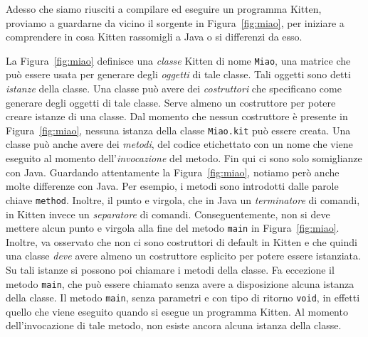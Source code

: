 Adesso che siamo riusciti a compilare ed eseguire un programma Kitten,
proviamo a guardarne \piu da vicino il sorgente in Figura~\ref{fig:miao}, per
iniziare a comprendere in cosa Kitten rassomigli a Java o si differenzi da esso.

La Figura~\ref{fig:miao} definisce una \emph{classe} Kitten di nome
\texttt{Miao}, \cioe una
matrice che pu\`o essere usata per generare degli \emph{oggetti} di tale
classe. Tali oggetti sono detti \emph{istanze} della classe.
Una classe pu\`o avere dei \emph{costruttori} che specificano come
generare degli oggetti di tale classe. Serve almeno un costruttore
per potere creare istanze di una classe. Dal momento che nessun costruttore
\`e presente in Figura~\ref{fig:miao}, nessuna istanza della classe
\texttt{Miao.kit} pu\`o essere creata.
Una classe pu\`o anche avere
dei \emph{metodi}, \cioe del codice etichettato con un nome che viene
eseguito al momento dell'\emph{invocazione} del metodo.
Fin qui ci sono solo somiglianze con Java.
Guardando attentamente la Figura~\ref{fig:miao},
notiamo per\`o anche molte differenze con Java. Per esempio, i metodi
sono introdotti dalle parole chiave \texttt{method}.
Inoltre, il punto e virgola, che in Java \e un \emph{terminatore} di comandi,
in Kitten \e invece un \emph{separatore} di comandi. Conseguentemente,
non si deve mettere alcun punto e virgola alla fine del metodo
\texttt{main} in Figura~\ref{fig:miao}. Inoltre, va osservato che non
ci sono costruttori di default in Kitten e che quindi una classe \emph{deve}
avere almeno un costruttore esplicito per potere essere
istanziata. Su tali istanze si possono poi chiamare i metodi
della classe. Fa eccezione il metodo \texttt{main}, che pu\`o essere
chiamato senza avere a disposizione alcuna istanza della classe.
Il metodo \texttt{main}, senza parametri e con tipo di ritorno \texttt{void},
\e in effetti quello che viene eseguito quando si esegue un programma Kitten.
Al momento dell'invocazione di tale metodo, non esiste ancora alcuna
istanza della classe.
%
%
